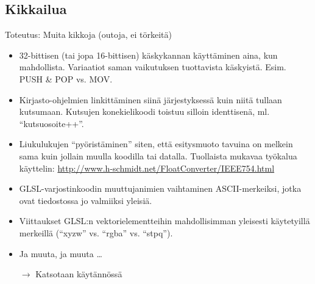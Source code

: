 \documentclass[pdf,10pt]{beamer}
\begin{document}
\subsection{Kikkailua}
\begin{frame}{Toteutus: Muita kikkoja (outoja, ei törkeitä)}
  \begin{itemize}
  \item 32-bittisen (tai jopa 16-bittisen) käskykannan käyttäminen
    aina, kun mahdollista. Variaatiot saman vaikutuksen tuottavista
    käskyistä. Esim. PUSH \& POP vs. MOV.
  \item Kirjasto-ohjelmien linkittäminen siinä järjestyksessä kuin
    niitä tullaan kutsumaan. Kutsujen konekielikoodi toistuu silloin
    identtisenä, ml. ``kutsuosoite++''.
  \item Liukulukujen ``pyöristäminen'' siten, että esitysmuoto tavuina
    on melkein sama kuin jollain muulla koodilla tai
    datalla. Tuollaista mukavaa työkalua käyttelin:
    \url{http://www.h-schmidt.net/FloatConverter/IEEE754.html}
  \item GLSL-varjostinkoodin muuttujanimien vaihtaminen
    ASCII-merkeiksi, jotka ovat tiedostossa jo valmiiksi yleisiä.
  \item Viittaukset GLSL:n vektorielementteihin mahdollisimman
    yleisesti käytetyillä merkeillä (``xyzw'' vs. ``rgba''
    vs. ``stpq'').
  \item Ja muuta, ja muuta \ldots
  \item[$\rightarrow$] Katsotaan käytännössä
  \end{itemize}
\end{frame}
\end{document}
